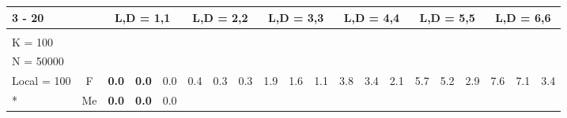 \documentclass[french,10pt]{article}
\begin{document}
    \begin{landscape}




\setlength\tabcolsep{0.07cm}
\begin{longtable}{ l  c | c c c | c c c | c c c | c c c | c c c | c c c | }
    \cline{3 -  20 }

        
&
       & \multicolumn{3}{|c}{
L,D = 1,1 }           & \multicolumn{3}{|c}{
L,D = 2,2 }           & \multicolumn{3}{|c}{
L,D = 3,3 }           & \multicolumn{3}{|c}{
L,D = 4,4 }           & \multicolumn{3}{|c}{
L,D = 5,5 }         & \multicolumn{3}{|c|}{
L,D = 6,6 }  \\     

    \endfirsthead
    \endhead
    \endfoot
    \endlastfoot

    \hline
                        \multirow{6}{*}{
             \makecell{ \textbf{ $(x_{i}) \mapsto (\exp(x_{i}) )$ } \\
        {\small K = 100 } \\
        {\small N = 50000 } \\ {\small Local = 100 }}
            }

                & {\small F  }

                    &                     \textbf{ 0.0}
     & {\footnotesize     \textbf{ 0.0}
    } & {\footnotesize     0.0
     }
    
    
                    &                     0.4
     & {\footnotesize     0.3
    } & {\footnotesize     0.3
     }
    
    
                    &                     1.9
     & {\footnotesize     1.6
    } & {\footnotesize     1.1
     }
    
    
                    &                     3.8
     & {\footnotesize     3.4
    } & {\footnotesize     2.1
     }
    
    
                    &                     5.7
     & {\footnotesize     5.2
    } & {\footnotesize     2.9
     }
    
    
                    &                     7.6
     & {\footnotesize     7.1
    } & {\footnotesize     3.4
     }
    
    
                    \\*
                        & {\small Me  }

                    &                     \textbf{ 0.0}
     & {\footnotesize     \textbf{ 0.0}
    } & {\footnotesize     0.0
     }
    

\end{longtable}
\end{landscape}
\end{document}
